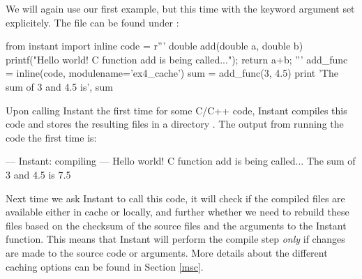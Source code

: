 We will again use our first example, but this time with
the keyword argument  set explicitely. The file can be found
under :
\begin{code}
from instant import inline
code = r'''
double add(double a, double b) { 
    printf("Hello world! C function add is being called...\n"); 
    return a+b;
}'''
add_func = inline(code, modulename='ex4_cache') 
sum = add_func(3, 4.5)
print 'The sum of 3 and 4.5 is', sum
\end{code}
Upon calling Instant the first time for some C/C++ code, Instant compiles this
code and stores the resulting files in a directory . The
output from running the code the first time is:
\begin{code}
--- Instant: compiling ---
Hello world! C function add is being called...
The sum of 3 and 4.5 is 7.5
\end{code}
Next time we ask
Instant to call this code, it will check if the compiled files are available
either in cache or locally, and further whether we need to rebuild these files
based on the checksum of the source files and the arguments to the Instant
function. This means that Instant will perform the compile step \emph{only} if
changes are made to the source code or arguments. More details about the
different caching options can be found in Section \ref{msc}. 


